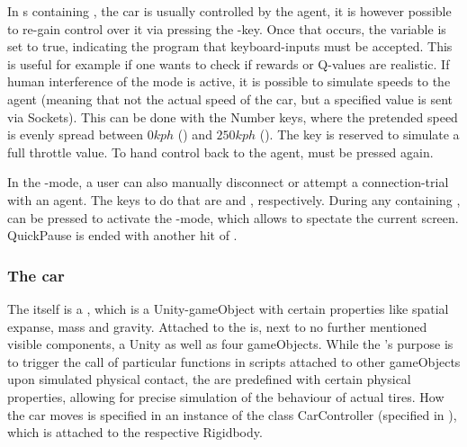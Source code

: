 In s containing , the car is usually controlled by the agent, it is however possible to re-gain control over it via pressing the -key. Once that occurs, the variable  is set to true, indicating the program that keyboard-inputs must be accepted. This is useful for example if one wants to check if rewards or Q-values are realistic. If human interference of the  mode is active, it is possible to simulate speeds to the agent (meaning that not the actual speed of the car, but a specified value is sent via Sockets). This can be done with the Number keys, where the pretended speed is evenly spread between $0 kph$ () and $250 kph$ (). The  key is reserved to simulate a full throttle value. To hand control back to the agent,  must be pressed again. 

In the -mode, a user can also manually disconnect or attempt a connection-trial with an agent. The keys to do that are  and , respectively. During any  containing ,  can be pressed to activate the -mode, which allows to spectate the current screen. QuickPause is ended with another hit of . 

\subsubsection{The car}

The  itself is a , which is a Unity-gameObject with certain properties like spatial expanse, mass and gravity. Attached to the  is, next to no further mentioned visible components, a Unity  as well as four  gameObjects. While the 's purpose is to trigger the call of particular functions in scripts attached to other gameObjects upon simulated physical contact, the  are predefined with certain physical properties, allowing for precise simulation of the behaviour of actual tires. How the car moves is specified in an instance of the class CarController (specified in ), which is attached to the respective Rigidbody.

